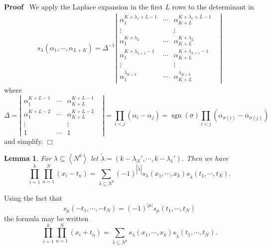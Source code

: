 \documentclass[11pt]{amsart}
\newcommand{\tmop}[1]{\ensuremath{\operatorname{#1}}}
\renewenvironment{proof}{
\noindent\textbf{Proof}\ }{\hspace*{\fill}
\begin{math}\Box\end{math}\medskip}
\newtheorem{lemma}{Lemma}
\begin{document}
\begin{proof}
We apply the Laplace expansion in the first $L$ rows to the
determinant in
\begin{eqnarray*}
   & s_{\lambda} ( \alpha_1, \cdots, \alpha_{L + K} ) = \Delta^{- 1} \left|
   \begin{array}{cccc}
     \alpha_1^{K + \lambda_1 + L - 1} & \cdots & \alpha_{K + L}^{K +
     \lambda_1 + L - 1} & \\
     \vdots &  & \vdots & \\
     \alpha_1^{K + \lambda_L} & \cdots & \alpha_{K + L}^{K + \lambda_L} & \\
     \alpha_1^{K + \lambda_{L + 1} - 1} & \cdots & \alpha_{K + L}^{K +
     \lambda_{L + 1} - 1} & \\
     \vdots &  & \vdots & \\
     \alpha_1^{\lambda_{K + L}} & \cdots & \alpha_{K + L}^{\lambda_{K + L}} &
   \end{array} \right| &
\end{eqnarray*}
where
\[ \Delta = \left| \begin{array}{cccc}
      \alpha_1^{K + L - 1} & \cdots & \alpha_{K + L}^{K + L - 1} & \\
      \alpha_1^{K + L - 2} & \cdots & \alpha_{K + L}^{K + L - 2} & \\
      \vdots &  & \vdots & \\
      1 & \cdots & 1 &
    \end{array} \right| = \prod_{i < j} ( \alpha_i - \alpha_j ) = \tmop{sgn}
    ( \sigma ) \prod_{i < j} ( \alpha_{\sigma ( i )} - \alpha_{\sigma ( j )}
    ) \]
and simplify.
\end{proof}





\begin{lemma} \label{unidecomp}
For $\lambda \subseteq \left\langle N^k \right\rangle$ let
$\tilde{\lambda} = ( k - \lambda_N', \cdots, k- \lambda_1' )$.
Then we have
\begin{equation} \label{e:udec}
   \prod_{i = 1}^k \prod_{n = 1}^N ( x_i  - t_n) =
   \sum_{\lambda \subseteq N^k} ( - 1 )^{| \tilde{\lambda} |}
   s_{\lambda} ( x_1, \cdots, x_k )
   s_{\tilde{\lambda}}  ( t_1, \cdots, t_N) .
\end{equation}
\end{lemma}

Using the fact that
\[s_\mu(-t_1,\cdots,-t_N)=(-1)^{|\mu|}s_\mu(t_1,\cdots,t_N)\]
the formula may be written
\begin{equation} \label{e:udecalt}
   \prod_{i = 1}^k \prod_{n = 1}^N ( x_i  + t_n) =
   \sum_{\lambda \subseteq N^k} s_{\lambda} ( x_1, \cdots, x_k )
   s_{\tilde{\lambda}}  ( t_1, \cdots, t_N) .
\end{equation}
\end{document}
